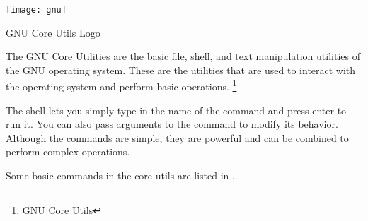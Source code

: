 \begin{marginfigure}
	\texttt{[image: gnu]}
	\caption[GNU Core Utils Logo]{GNU Core Utils Logo}
\end{marginfigure}

\begin{definition}
  The GNU Core Utilities are the basic file, shell, and text manipulation utilities of the GNU operating system. These are the utilities that are used to interact with the operating system and perform basic operations.
  \footnote{
    \href{https://www.gnu.org/software/coreutils/}{GNU Core Utils}
  }
\end{definition}

The shell lets you simply type in the name of the command and press enter to run it.
You can also pass arguments to the command to modify its behavior.
Although the commands are simple, they are powerful and can be combined to perform complex operations.

Some basic commands in the core-utils are listed in .

